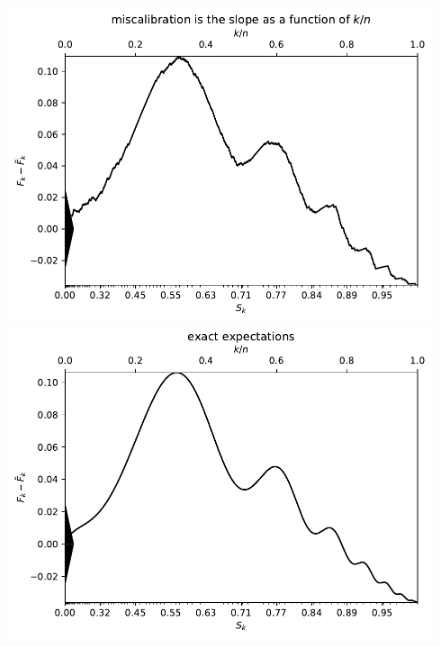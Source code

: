 \documentclass{article}
\begin{document}
\begin{figure}
\begin{centering}

\parbox{\imsize}{\includegraphics[width=\imsize]
                {./codes/unweighted/1000_10_2_1/cumulative.pdf}}
\quad\quad
\parbox{\imsize}{\includegraphics[width=\imsize]
                {./codes/unweighted/1000_10_2_1/cumulative_exact.pdf}}

\vspace{\vertsep}


\end{centering}
\end{figure}
\end{document}
